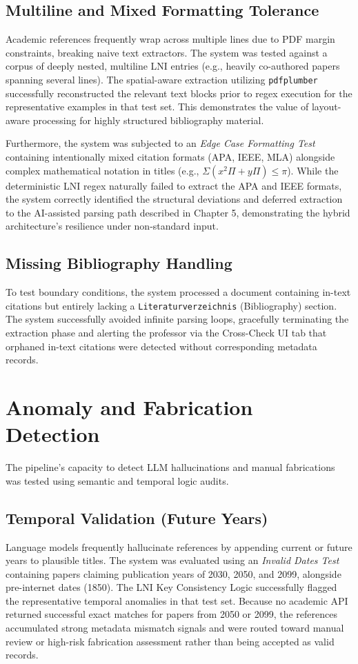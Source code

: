 \documentclass[12pt,a4paper,oneside]{report}
\begin{document}
\subsection{Multiline and Mixed Formatting Tolerance}
Academic references frequently wrap across multiple lines due to PDF margin constraints, breaking naive text extractors. The system was tested against a corpus of deeply nested, multiline LNI entries (e.g., heavily co-authored papers spanning several lines). The spatial-aware extraction utilizing \texttt{pdfplumber} successfully reconstructed the relevant text blocks prior to regex execution for the representative examples in that test set. This demonstrates the value of layout-aware processing for highly structured bibliography material.

Furthermore, the system was subjected to an \textit{Edge Case Formatting Test} containing intentionally mixed citation formats (APA, IEEE, MLA) alongside complex mathematical notation in titles (e.g., $\Sigma(x^{2}\Pi+y\Pi)\le\pi$). While the deterministic LNI regex naturally failed to extract the APA and IEEE formats, the system correctly identified the structural deviations and deferred extraction to the AI-assisted parsing path described in Chapter 5, demonstrating the hybrid architecture's resilience under non-standard input.

\subsection{Missing Bibliography Handling}
To test boundary conditions, the system processed a document containing in-text citations but entirely lacking a \texttt{Literaturverzeichnis} (Bibliography) section. The system successfully avoided infinite parsing loops, gracefully terminating the extraction phase and alerting the professor via the Cross-Check UI tab that orphaned in-text citations were detected without corresponding metadata records.

\section{Anomaly and Fabrication Detection}

The pipeline's capacity to detect LLM hallucinations and manual fabrications was tested using semantic and temporal logic audits.

\subsection{Temporal Validation (Future Years)}
Language models frequently hallucinate references by appending current or future years to plausible titles. The system was evaluated using an \textit{Invalid Dates Test} containing papers claiming publication years of 2030, 2050, and 2099, alongside pre-internet dates (1850). The LNI Key Consistency Logic successfully flagged the representative temporal anomalies in that test set. Because no academic API returned successful exact matches for papers from 2050 or 2099, the references accumulated strong metadata mismatch signals and were routed toward manual review or high-risk fabrication assessment rather than being accepted as valid records.
\end{document}
